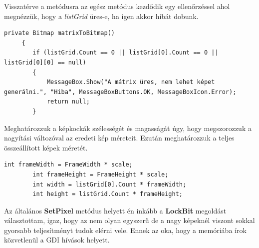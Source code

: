 \documentclass[]{thesis-ekf}
\theoremstyle{definition}
\theoremstyle{remark}
\begin{document}
Visszatérve a metódusra az egész metódus kezdődik egy ellenőrzéssel ahol megnézzük, hogy a \emph{listGrid} üres-e, ha igen akkor hibát dobunk.
\begin{lstlisting}[language=CSharp]
	  private Bitmap matrixToBitmap()
	 {
	 	if (listGrid.Count == 0 || listGrid[0].Count == 0 || listGrid[0][0] == null)
	 	{
	 		MessageBox.Show("A mátrix üres, nem lehet képet generálni.", "Hiba", MessageBoxButtons.OK, MessageBoxIcon.Error);
	 		return null;
	 	}
\end{lstlisting}
Meghatározzuk a képkockák szélességét és magasságát úgy, hogy megszorozzuk a nagyítási változóval az eredeti kép méreteit. Ezután meghatározzuk a teljes összeállított képek méretét.
\begin{lstlisting}[language=CSharp]
	 	int frameWidth = FrameWidth * scale;
	 	int frameHeight = FrameHeight * scale;
	 	int width = listGrid[0].Count * frameWidth;
	 	int height = listGrid.Count * frameHeight;
\end{lstlisting}
Az általános \textbf{SetPixel} metódus helyett én inkább a \textbf{LockBit}\cite{lockbit}\cite{fastpixeloperation} megoldást választottam, igaz, hogy az nem olyan egyszerű de a nagy képeknél viszont sokkal gyorsabb teljesítményt tudok elérni vele. Ennek az oka, hogy a memóriába írok közvetlenül a GDI hívások helyett.
\end{document}
